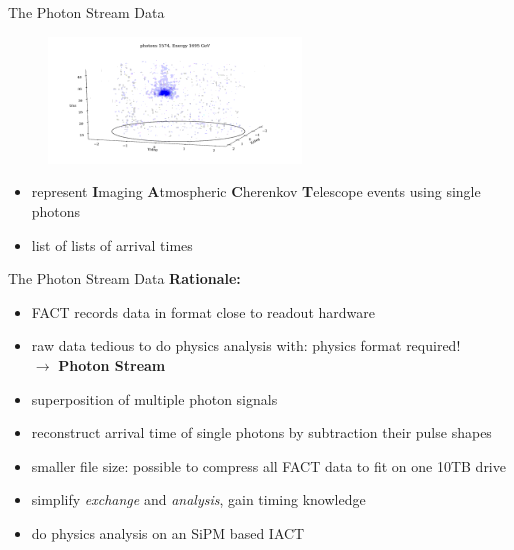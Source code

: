 \begin{frame}[t]{The Photon Stream Data}
  \begin{multicols}{2}
    \begin{figure}
        \centering
        \includegraphics[width=0.6\textwidth]{fig/event/example_event_small-15.png}
    \end{figure}
    \columnbreak
    \vspace*{\fill}
      \begin{itemize}
        \item represent \textbf{I}maging \textbf{A}tmospheric \textbf{C}herenkov \textbf{T}elescope events using single photons
        \item list of lists of arrival times
    \end{itemize}
    \vspace*{\fill}
  \end{multicols}
\end{frame}

\begin{frame}[t]{The Photon Stream Data}
    \large{\textbf{Rationale:}}
    \begin{itemize}
        \item FACT records data in format close to readout hardware
        \item raw data tedious to do physics analysis with: physics format required! \\ $\rightarrow$ \textbf{Photon Stream}
        \item superposition of multiple photon signals
        \item reconstruct arrival time of single photons by subtraction their pulse shapes 
        \item smaller file size: possible to compress all FACT data to fit on one 10TB drive 
        \item simplify \textit{exchange} and \textit{analysis}, gain timing knowledge
        \item do physics analysis on an SiPM based IACT
    \end{itemize}
\end{frame}


